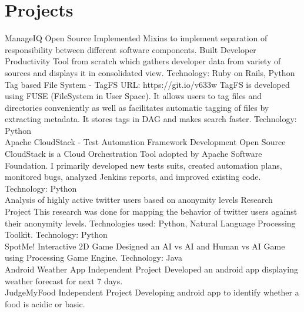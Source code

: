 \documentclass[]{friggeri-cv}
\begin{document}
\section{Projects}
\begin{entrylist}
\entry
    {ManageIQ }
    {Open Source}
    {Implemented Mixins to implement separation of responsibility between different software components. Built Developer Productivity Tool from scratch which gathers developer data from variety of sources and displays it in consolidated view. Technology: Ruby on Rails, Python\\}
  \entry
    {Tag based File System - TagFS }
    {URL: https://git.io/v633w}
    {TagFS is developed using FUSE (FileSystem in User Space). It allows users to tag files and directories conveniently as well as facilitates automatic tagging of files by extracting metadata. It stores tags in DAG and makes search faster. Technology: Python\\}
    \entry
    {Apache CloudStack - Test Automation Framework Development }
    {Open Source}
    {CloudStack is a Cloud Orchestration Tool adopted by Apache Software Foundation. I primarily developed new tests suits, created automation plans, monitored bugs, analyzed Jenkins reports, and improved existing code. Technology: Python\\}
    \entry
    {Analysis of highly active twitter users based on anonymity levels}
    {Research Project}
    {This research was done for mapping the behavior of twitter users against their anonymity levels. Technologies used: Python, Natural Language Processing Toolkit. Technology: Python\\}
    \entry
    {SpotMe! Interactive 2D Game}
    {}
    {Designed an AI vs AI and Human vs AI Game using Processing Game Engine. Technology: Java\\}
    \entry
    {Android Weather App}
    {Independent Project}
    {Developed an android app displaying weather forecast for next 7 days.\\}
    \entry
    {JudgeMyFood}
    {Independent Project}
    {Developing android app to identify whether a food is acidic or basic.\\}
\end{entrylist}
\end{document}
